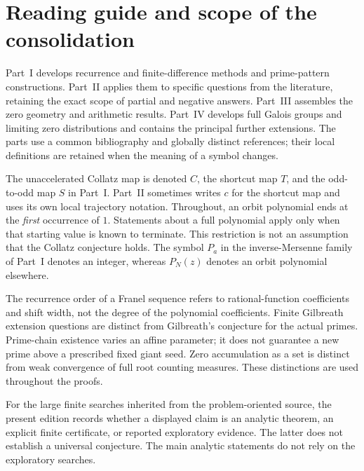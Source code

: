 \documentclass[11pt,a4paper]{article}
\theoremstyle{definition}
\theoremstyle{remark}
\numberwithin{equation}{section}
\begin{document}
\section*{Reading guide and scope of the consolidation}
Part~I develops recurrence and finite-difference methods and prime-pattern
constructions. Part~II applies them to specific questions from the literature,
retaining the exact scope of partial and negative answers. Part~III assembles
the zero geometry and arithmetic results. Part~IV develops full Galois groups
and limiting zero distributions and contains the principal further extensions.
The parts use a common bibliography and globally distinct references; their
local definitions are retained when the meaning of a symbol changes.

The unaccelerated Collatz map is denoted $C$, the shortcut map $T$, and the
odd-to-odd map $S$ in Part~I. Part~II sometimes writes $c$ for the shortcut
map and uses its own local trajectory notation. Throughout, an orbit
polynomial ends at the \emph{first} occurrence of $1$. Statements about a
full polynomial apply only when that starting value is known to terminate.
This restriction is not an assumption that the Collatz conjecture holds.
The symbol $P_a$ in the inverse-Mersenne family of Part~I denotes an integer,
whereas $P_N(z)$ denotes an orbit polynomial elsewhere.

The recurrence order of a Franel sequence refers to rational-function
coefficients and shift width, not the degree of the polynomial coefficients.
Finite Gilbreath extension questions are distinct from Gilbreath's conjecture
for the actual primes. Prime-chain existence varies an affine parameter;
it does not guarantee a new prime above a prescribed fixed giant seed.
Zero accumulation as a set is distinct from weak convergence of full root
counting measures. These distinctions are used throughout the proofs.

For the large finite searches inherited from the problem-oriented source,
the present edition records whether a displayed claim is an analytic theorem,
an explicit finite certificate, or reported exploratory evidence. The latter
does not establish a universal conjecture. The main analytic statements do
not rely on the exploratory searches.
\end{document}
